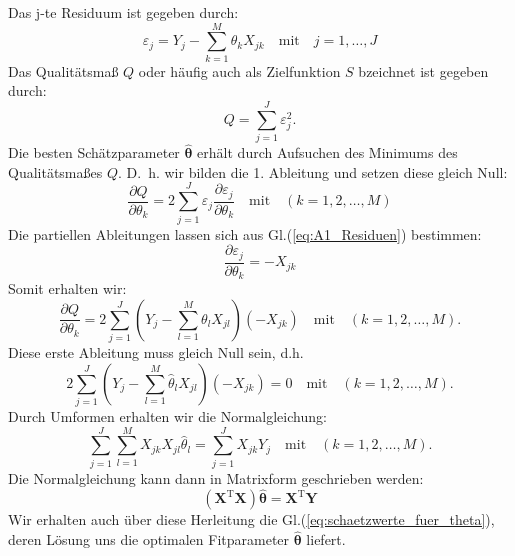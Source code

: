 Das j-te Residuum ist gegeben durch:
\begin{equation}
\varepsilon_j= Y_j - \sum_{k=1}^{M}\theta_k X_{jk} \quad \mathrm{mit}
\quad j=1,\ldots,J
\label{eq:A1_Residuen}
\end{equation}
Das Qualitätsmaß $Q$ oder häufig auch als Zielfunktion $S$ bzeichnet
ist gegeben durch:
\begin{equation}
Q = \sum_{j=1}^J \varepsilon_j^2.
\end{equation}
Die besten Schätzparameter $\hat{\boldsymbol{\theta}}$
erhält durch Aufsuchen des Minimums des Qualitätsmaßes $Q$.
D.~h. wir bilden die 1. Ableitung und setzen diese gleich Null:
\begin{equation}
\frac{\partial Q}{\partial \theta_k} =2\sum_{j = 1}^J \varepsilon_j\frac{\partial \varepsilon_j}{\partial \theta_k} \quad \mathrm{mit} \quad (k=1,2,\ldots, M)
\end{equation}
Die partiellen Ableitungen lassen sich aus Gl.(\ref{eq:A1_Residuen}) bestimmen:
\begin{equation}
\frac{\partial \varepsilon_j}{\partial \theta_k}=-X_{jk}
\end{equation}
Somit erhalten wir:
\begin{equation}
\frac{\partial Q}{\partial \theta_k} = 2\sum_{j=1}^{J} \left( Y_j-\sum_{l=1}^{M} \theta_l X_{jl} \right) (-X_{jk})
\quad \mathrm{mit} \quad (k=1,2,\dots, M).
\end{equation}
Diese erste Ableitung muss gleich Null sein, d.h.
\begin{equation}
2\sum_{j=1}^{J} \left( Y_j-\sum_{l=1}^{M} \hat\theta_l X_{jl} \right) (-X_{jk})
= 0 \quad \mathrm{mit} \quad (k=1,2,\dots, M).
\end{equation}
Durch Umformen erhalten wir die \glqq Normalgleichung\grqq:
\begin{equation}
\sum_{j=1}^{J} \sum_{l=1}^{M} X_{jk} X_{jl} \hat\theta_l
= \sum_{j=1}^{J} X_{jk} Y_j \quad \mathrm{mit} \quad (k=1,2,\dots, M).
\end{equation}
Die Normalgleichung kann dann in Matrixform geschrieben werden:
\begin{equation}
(\mathbf X^\mathrm{T} \mathbf X) \hat{\boldsymbol{\theta}} = \mathbf X^\mathrm{T} \mathbf Y
\end{equation}
Wir erhalten auch über diese Herleitung die Gl.(\ref{eq:schaetzwerte_fuer_theta}),
deren Lösung uns die optimalen Fitparameter $\hat{\boldsymbol{\theta}}$ liefert.

